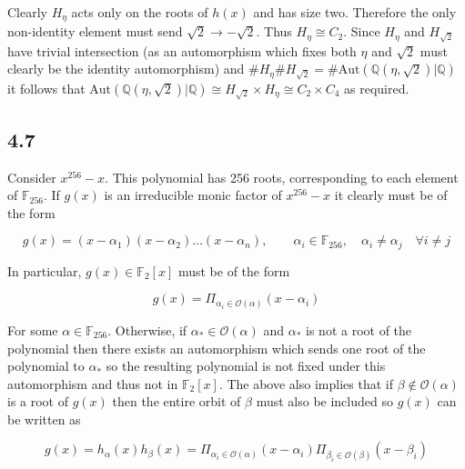 \documentclass{article}
\begin{document}
\paragraph{}
Clearly $H_\eta$ acts only on the roots of $h(x)$ and has size two. Therefore the only non-identity 
element must send $\sqrt{2} \rightarrow -\sqrt{2}$. Thus $H_\eta \cong C_2$. Since $H_\eta$ and $H_{\sqrt{2}}$ have trivial intersection (as 
an automorphism which fixes both $\eta$ and $\sqrt{2}$ must clearly be the identity automorphism)
and $\#H_\eta\#H_{\sqrt{2}} = \#\text{Aut}(\mathbb{Q}(\eta,\sqrt{2})|\mathbb{Q})$ it follows 
that $\text{Aut}(\mathbb{Q}(\eta,\sqrt{2})|\mathbb{Q}) \cong H_{\sqrt{2}} \times H_\eta \cong C_2 \times C_4$ as required.

\subsection*{4.7}
Consider $x^{256}-x$. This polynomial has 256 roots, corresponding to each element of $\mathbb{F}_{256}$. 
If $g(x)$ is an irreducible monic factor of $x^{256}-x$ it clearly must be of the form 

\begin{equation*}
    g(x) = (x-\alpha_1)(x-\alpha_2)\dots(x-\alpha_n),\qquad \alpha_i \in \mathbb{F}_{256},\quad \alpha_i \neq \alpha_j\quad \forall i \neq j
\end{equation*}

In particular, $g(x) \in \mathbb{F}_2[x]$ must be of the form 

\begin{equation*}
    g(x) = \Pi_{\alpha_i \in \mathcal{O}(\alpha)}(x - \alpha_i)
\end{equation*}

For some $\alpha \in \mathbb{F}_{256}$. Otherwise, if $\alpha_* \in \mathcal{O}(\alpha)$ and 
$\alpha_*$ is not a root of the polynomial then there exists an automorphism which sends one root 
of the polynomial to $\alpha_*$ so the resulting polynomial is not fixed under this automorphism 
and thus not in $\mathbb{F}_2[x]$. The above also implies that if $\beta \notin \mathcal{O}(\alpha)$ is 
a root of $g(x)$ then the entire orbit of $\beta$ must also be included so $g(x)$ can be written as 

\begin{equation*}
    g(x) = h_\alpha(x)h_\beta(x) = \Pi_{\alpha_i \in \mathcal{O}(\alpha)}(x - \alpha_i)\Pi_{\beta_i \in \mathcal{O}(\beta)}(x - \beta_i)
\end{equation*}
\end{document}
